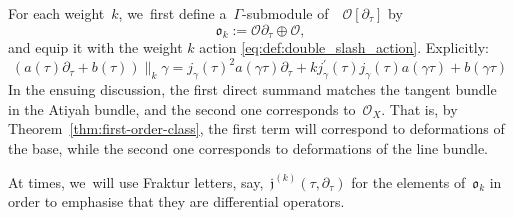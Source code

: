 \documentclass[10pt,a4paper]{article}
\numberwithin{equation}{section}
\theoremstyle{plain}
\theoremstyle{definition}
\newcommand{\tx}{\text}
\newcommand{\nbd}{\nobreakdash-\hspace{0pt}}
\newcommand{\cO}{\ensuremath{\mathcal{O}}}
\newcommand{\frakj}{\ensuremath{\mathfrak{j}}}
\newcommand{\frako}{\ensuremath{\mathfrak{o}}}
\newcommand{\defeq}{:=}
\let\Ga\Gamma
\let\ga\gamma
\begin{document}
For each weight~$k$, we~first define a~$\Ga$\nbd{}submodule of~~$\cO[\partial_\tau]$ by
\begin{equation}
\label{eq:def:frako}
\frako_k
\defeq
\cO\partial_\tau \oplus \cO
\tx{,}
\end{equation}
and equip it with the weight $k$ action \ref{eq:def:double_slash_action}. Explicitly:
\[
\left(a(\tau)\partial_\tau+b(\tau)\right)\big\|_k \ga = j_\ga(\tau)^2a(\ga\tau)\partial_\tau + kj_\ga^\prime(\tau)j_\ga(\tau)a(\ga\tau)+b(\ga\tau)\]
In the ensuing discussion, the first direct summand matches the tangent bundle in the Atiyah bundle, and the second one corresponds to~$\cO_X$. That is, by Theorem~\ref{thm:first-order-class}, the first term will correspond to deformations of the base, while the second one corresponds to deformations of the line bundle.

At times, we~will use Fraktur letters, say,~$\frakj^{(k)}(\tau, \partial_\tau)$ for the elements of~$\frako_k$ in order to emphasise that they are differential operators.
\end{document}
